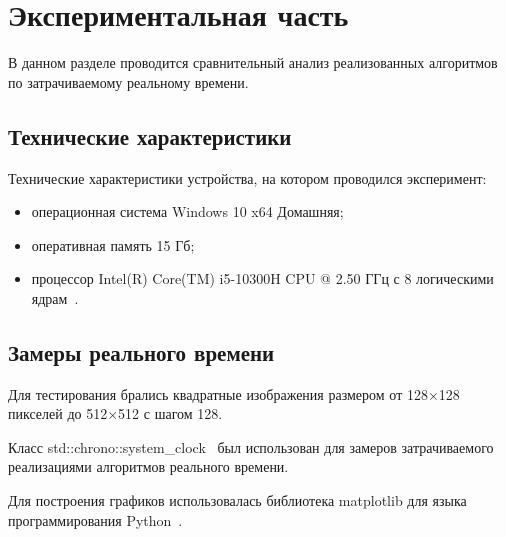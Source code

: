 \section{Экспериментальная часть}

В данном разделе проводится сравнительный анализ реализованных алгоритмов по затрачиваемому реальному времени.

\subsection{Технические характеристики}
Технические характеристики устройства, на котором проводился эксперимент:
\begin{itemize}
	\item операционная система Windows 10 x64 Домашняя;
	\item оперативная память 15 Гб;
	\item процессор Intel(R) Core(TM) i5-10300H CPU @ 2.50 ГГц с 8 логическими ядрам~\cite{processor}.
\end{itemize}

\subsection{Замеры реального времени}
Для тестирования брались квадратные изображения размером от 128$\times$128 пикселей до 512$\times$512 с шагом 128. 

Класс std::chrono::system\_clock~\cite{clock} был использован для замеров затрачиваемого реализациями алгоритмов реального времени.

Для построения графиков использовалась библиотека matplotlib для языка программирования Python~\cite{mpl}.


